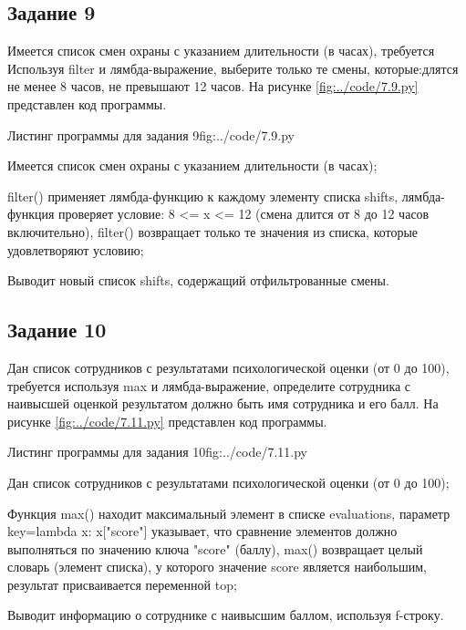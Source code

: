 \documentclass{vvsu}
\begin{document}
\subsection{Задание 9}
  Имеется список смен охраны с указанием длительности (в часах), требуется Используя filter и лямбда-выражение, выберите только те смены, которые:длятся не менее 8 часов, не превышают 12 часов.
На рисунке \ref{fig:../code/7.9.py} представлен код программы.

\begin{vvsu_figure}{Листинг программы для задания 9}{fig:../code/7.9.py}
  \begin{minipage}{.75\textwidth}
    
  \end{minipage}
\end{vvsu_figure}

\begin{vvsu_list}
  \item Имеется список смен охраны с указанием длительности (в часах);
  \item filter() применяет лямбда-функцию к каждому элементу списка shifts, лямбда-функция проверяет условие: 8 <= x <= 12 (смена длится от 8 до 12 часов включительно), filter() возвращает только те значения из списка, которые удовлетворяют условию;
\end{vvsu_list}
  Выводит новый список shifts, содержащий отфильтрованные смены.

\subsection{Задание 10}
  Дан список сотрудников с результатами психологической оценки (от 0 до 100), требуется используя max и лямбда-выражение, определите сотрудника с наивысшей оценкой результатом должно быть имя сотрудника и его балл.
На рисунке \ref{fig:../code/7.11.py} представлен код программы.

\begin{vvsu_figure}{Листинг программы для задания 10}{fig:../code/7.11.py}
  \begin{minipage}{.75\textwidth}
    
  \end{minipage}
\end{vvsu_figure}

\begin{vvsu_list}
  \item Дан список сотрудников с результатами психологической оценки (от 0 до 100);
  \item Функция max() находит максимальный элемент в списке evaluations, параметр key=lambda x: x["score"] указывает, что сравнение элементов должно выполняться по значению ключа "score" (баллу), max() возвращает целый словарь (элемент списка), у которого значение score является наибольшим, результат присваивается переменной top;
\end{vvsu_list}
  Выводит информацию о сотруднике с наивысшим баллом, используя f-строку.
\end{document}
